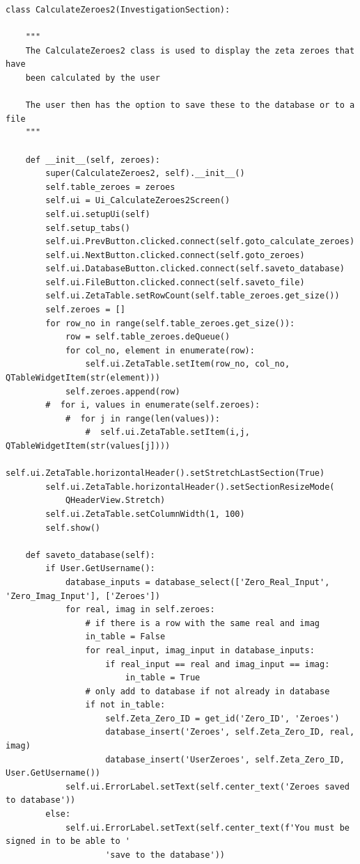 \documentclass{article}
\begin{document}
\begin{lstlisting}
class CalculateZeroes2(InvestigationSection):

    """
    The CalculateZeroes2 class is used to display the zeta zeroes that have
    been calculated by the user

    The user then has the option to save these to the database or to a file
    """

    def __init__(self, zeroes):
        super(CalculateZeroes2, self).__init__()
        self.table_zeroes = zeroes
        self.ui = Ui_CalculateZeroes2Screen()
        self.ui.setupUi(self)
        self.setup_tabs()
        self.ui.PrevButton.clicked.connect(self.goto_calculate_zeroes)
        self.ui.NextButton.clicked.connect(self.goto_zeroes)
        self.ui.DatabaseButton.clicked.connect(self.saveto_database)
        self.ui.FileButton.clicked.connect(self.saveto_file)
        self.ui.ZetaTable.setRowCount(self.table_zeroes.get_size())
        self.zeroes = []
        for row_no in range(self.table_zeroes.get_size()):
            row = self.table_zeroes.deQueue()
            for col_no, element in enumerate(row):
                self.ui.ZetaTable.setItem(row_no, col_no, QTableWidgetItem(str(element)))
            self.zeroes.append(row)
        #  for i, values in enumerate(self.zeroes):
            #  for j in range(len(values)):
                #  self.ui.ZetaTable.setItem(i,j, QTableWidgetItem(str(values[j])))
        self.ui.ZetaTable.horizontalHeader().setStretchLastSection(True)
        self.ui.ZetaTable.horizontalHeader().setSectionResizeMode(
            QHeaderView.Stretch)
        self.ui.ZetaTable.setColumnWidth(1, 100)
        self.show()

    def saveto_database(self):
        if User.GetUsername():
            database_inputs = database_select(['Zero_Real_Input', 'Zero_Imag_Input'], ['Zeroes'])
            for real, imag in self.zeroes:
                # if there is a row with the same real and imag
                in_table = False
                for real_input, imag_input in database_inputs:
                    if real_input == real and imag_input == imag:
                        in_table = True
                # only add to database if not already in database
                if not in_table:
                    self.Zeta_Zero_ID = get_id('Zero_ID', 'Zeroes')
                    database_insert('Zeroes', self.Zeta_Zero_ID, real, imag)
                    database_insert('UserZeroes', self.Zeta_Zero_ID, User.GetUsername())
            self.ui.ErrorLabel.setText(self.center_text('Zeroes saved to database'))
        else:
            self.ui.ErrorLabel.setText(self.center_text(f'You must be signed in to be able to '
                    'save to the database'))


\end{lstlisting}
\end{document}
